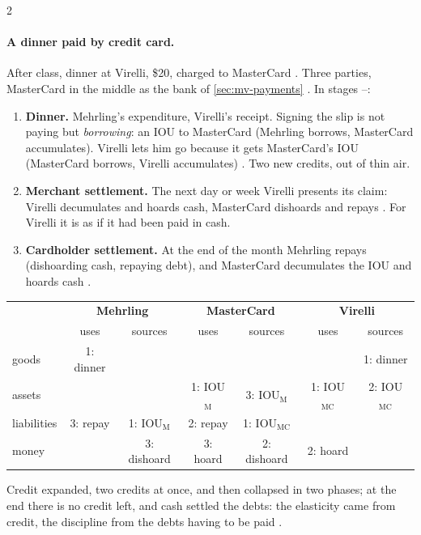 \begin{paracol}{2}
\paragraph{A dinner paid by credit card.} After class, dinner at Virelli, \$20, charged to MasterCard . Three parties,
MasterCard in the middle as the bank of \cref{sec:mv-payments} . In stages --:
\begin{enumerate}
  \item \textbf{Dinner.} Mehrling's expenditure, Virelli's receipt. Signing the slip is not paying but \emph{borrowing}: an IOU to MasterCard
        (Mehrling borrows, MasterCard accumulates). Virelli lets him go because it gets MasterCard's IOU (MasterCard borrows, Virelli
        accumulates) . Two new credits, out of thin air.
  \item \textbf{Merchant settlement.} The next day or week Virelli presents its claim: Virelli decumulates and hoards cash, MasterCard dishoards
        and repays . For Virelli it is as if it had been paid in cash.
  \item \textbf{Cardholder settlement.} At the end of the month Mehrling repays (dishoarding cash, repaying debt), and MasterCard decumulates the
        IOU and hoards cash .
\end{enumerate}
\begin{center}
\begin{tabular}{l|cc|cc|cc}
 & \multicolumn{2}{c|}{\textbf{Mehrling}} & \multicolumn{2}{c|}{\textbf{MasterCard}} & \multicolumn{2}{c}{\textbf{Virelli}}\\
 & uses & sources & uses & sources & uses & sources\\\hline
goods & 1: dinner & & & & & 1: dinner\\\hline
assets & & & 1: IOU$_\text{M}$ & 3: IOU$_\text{M}$ & 1: IOU$_\text{MC}$ & 2: IOU$_\text{MC}$\\
liabilities & 3: repay & 1: IOU$_\text{M}$ & 2: repay & 1: IOU$_\text{MC}$ & & \\
money & & 3: dishoard & 3: hoard & 2: dishoard & 2: hoard & \\
\end{tabular}
\end{center}
Credit expanded, two credits at once, and then collapsed in two phases; at the end there is no credit left, and cash settled the debts: the
elasticity came from credit, the discipline from the debts having to be paid .


\end{paracol}
